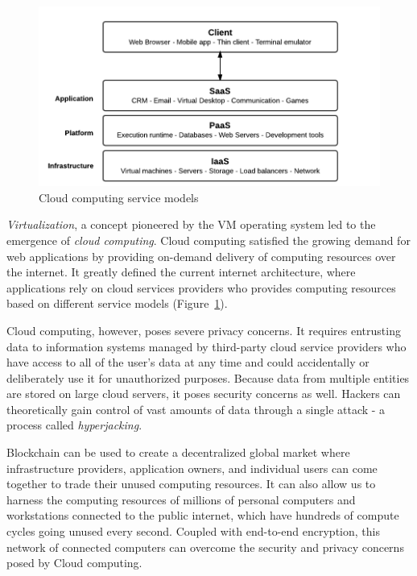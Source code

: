 	\begin{figure}[h]
		\includegraphics[width=\linewidth]{figures/service-models}
		\caption{\label{fig:service-models} Cloud computing service models\protect\cite{image:cloud:1}}
	\end{figure}
	
	\textit{Virtualization}\cite{pub:vm:1}, a concept pioneered by the VM\cite{creasy1981origin} operating system led to the emergence of \textit{cloud computing}. Cloud computing satisfied the growing demand for web applications by providing on-demand delivery of computing resources over the internet. It greatly defined the current internet architecture, where applications rely on cloud services providers who provides computing resources based on different service models (Figure~\ref{fig:service-models}).
	
	Cloud computing, however, poses severe privacy concerns. It requires entrusting data to information systems managed by third-party cloud service providers who have access to all of the user's data at any time and could accidentally or deliberately use it for unauthorized purposes\cite{ryan2011cloud}. Because data from multiple entities are stored on large cloud servers, it poses security concerns as well. Hackers can theoretically gain control of vast amounts of data through a single attack - a process called \textit{hyperjacking}\cite{pub:hyperjack:1}.
	
	Blockchain can be used to create a decentralized global market where infrastructure providers,  application owners, and individual users can come together to trade their unused computing resources. It can also allow us to harness the computing resources of millions of personal computers and workstations connected to the public internet, which have hundreds of compute cycles going unused every second\cite{crowcroft2003peer}. Coupled with end-to-end encryption, this network of connected computers can overcome the security and privacy concerns posed by Cloud computing.
	
